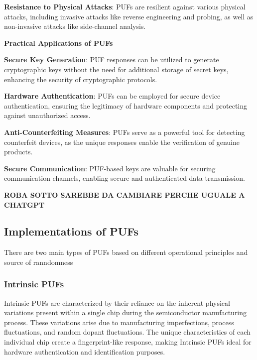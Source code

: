 \documentclass{article}
\begin{document}
\textbf{Resistance to Physical Attacks}: PUFs are resilient against various physical attacks, including invasive attacks like reverse engineering and probing, as well as non-invasive attacks like side-channel analysis.


\textbf{Practical Applications of PUFs}


\textbf{Secure Key Generation}: PUF responses can be utilized to generate cryptographic keys without the need for additional storage of secret keys, enhancing the security of cryptographic protocols.


\textbf{Hardware Authentication}: PUFs can be employed for secure device authentication, ensuring the legitimacy of hardware components and protecting against unauthorized access.


\textbf{Anti-Counterfeiting Measures}: PUFs serve as a powerful tool for detecting counterfeit devices, as the unique responses enable the verification of genuine products.


\textbf{Secure Communication}: PUF-based keys are valuable for securing communication channels, enabling secure and authenticated data transmission.



\textbf{ ROBA SOTTO SAREBBE DA CAMBIARE PERCHE UGUALE A CHATGPT}
\subsection{Implementations of PUFs}
There are two main types of PUFs based on different operational principles and source of ranndomness
\subsubsection{Intrinsic PUFs}

Intrinsic PUFs are characterized by their reliance on the inherent physical variations present within a single chip during the semiconductor manufacturing process. These variations arise due to manufacturing imperfections, process fluctuations, and random dopant fluctuations. The unique characteristics of each individual chip create a fingerprint-like response, making Intrinsic PUFs ideal for hardware authentication and identification purposes.
\end{document}

